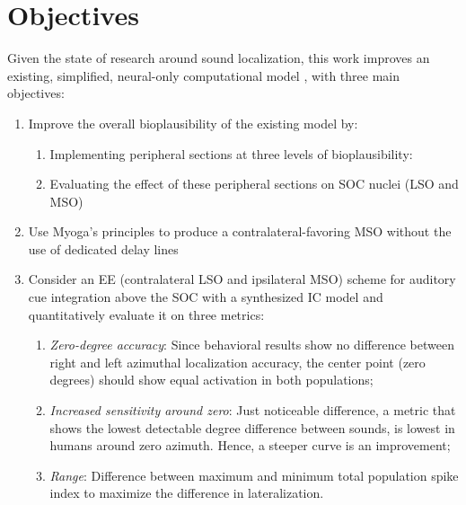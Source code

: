 \documentclass[11pt,a4paper,twocolumn]{article}
\begin{document}
\section{Objectives}
Given the state of research around sound localization, this work improves an existing, simplified, neural-only computational model \cite{santisComputationalModelMammalian}, with three main objectives:
\begin{enumerate}
    \item\label{obj:bioplaus} Improve the overall bioplausibility of the existing model by:
    \begin{enumerate}
        \item Implementing peripheral sections at three levels of bioplausibility:
        \item Evaluating the effect of these peripheral sections on SOC nuclei (LSO and MSO)
    \end{enumerate}
    \item\label{obj:mso} Use Myoga's principles to produce a contralateral-favoring MSO without the use of dedicated delay lines
    \item\label{obj:icc} Consider an EE (contralateral LSO and ipsilateral MSO) scheme for auditory cue integration above the SOC with a synthesized IC model and quantitatively evaluate it on three metrics:
    \begin{enumerate}
        \item \textit{Zero-degree accuracy}: Since behavioral results show no difference between right and left azimuthal localization accuracy, the center point (zero degrees) should show equal activation in both populations;
        \item \textit{Increased sensitivity around zero}: Just noticeable difference, a metric that shows the lowest detectable degree difference between sounds, is lowest in humans around zero azimuth. Hence, a steeper curve is an improvement;
        \item \textit{Range}: Difference between maximum and minimum total population spike index to maximize the difference in lateralization.
    \end{enumerate}
\end{enumerate}
\end{document}
